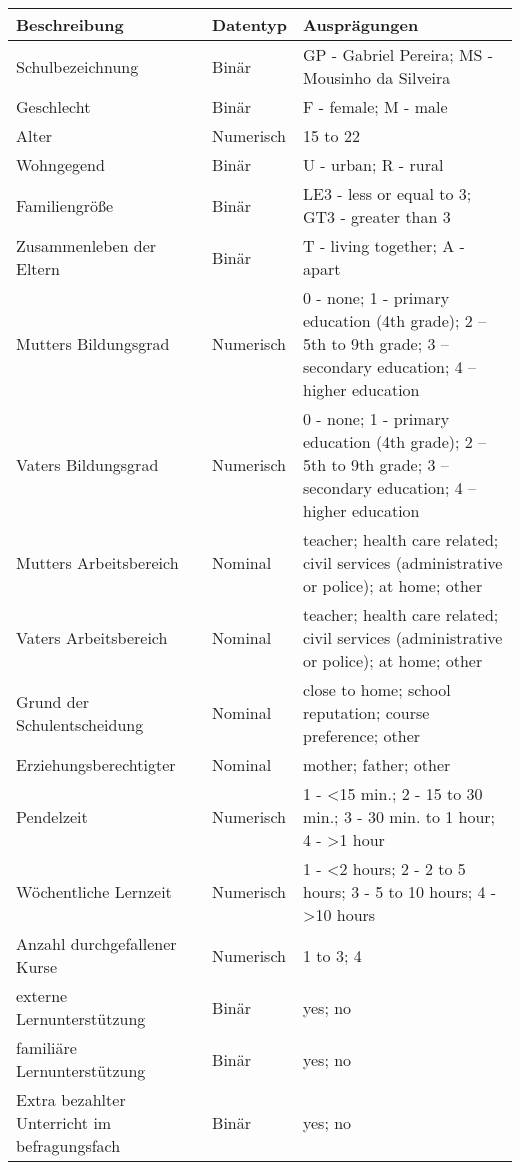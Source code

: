 \begin{table}[!ht]
    \centering
    \begin{tabular}{lll}
    \hline
        \textbf{Beschreibung} & \textbf{Datentyp} & \textbf{Ausprägungen} \\ \hline
        Schulbezeichnung & Binär & GP - Gabriel Pereira; MS - Mousinho da Silveira \\ 
        Geschlecht & Binär & F - female; M - male \\ 
        Alter & Numerisch & 15 to 22 \\ 
        Wohngegend & Binär & U - urban; R - rural \\ 
        Familiengröße & Binär & LE3 - less or equal to 3; GT3 - greater than 3 \\ 
        Zusammenleben der Eltern & Binär & T - living together; A - apart \\ 
        Mutters Bildungsgrad & Numerisch & 0 - none; 1 - primary education (4th grade); 2 – 5th to 9th grade; 3 – secondary education; 4 – higher education \\ 
        Vaters Bildungsgrad & Numerisch & 0 - none; 1 - primary education (4th grade); 2 – 5th to 9th grade; 3 – secondary education; 4 – higher education \\ 
        Mutters Arbeitsbereich & Nominal & teacher; health care related; civil services (administrative or police); at home; other \\ 
        Vaters Arbeitsbereich & Nominal & teacher; health care related; civil services (administrative or police); at home; other \\ 
        Grund der Schulentscheidung & Nominal & close to home; school reputation; course preference; other \\ 
        Erziehungsberechtigter & Nominal & mother; father; other \\ 
        Pendelzeit & Numerisch & 1 - <15 min.; 2 - 15 to 30 min.; 3 - 30 min. to 1 hour; 4 - >1 hour \\ 
        Wöchentliche Lernzeit & Numerisch & 1 - <2 hours; 2 - 2 to 5 hours; 3 - 5 to 10 hours; 4 - >10 hours \\ 
        Anzahl durchgefallener Kurse & Numerisch & 1 to 3; 4 \\ 
        externe Lernunterstützung & Binär & yes; no \\ 
        familiäre Lernunterstützung & Binär & yes; no \\ 
        Extra bezahlter Unterricht im befragungsfach & Binär & yes; no \\ 

\end{tabular}
\end{table}
